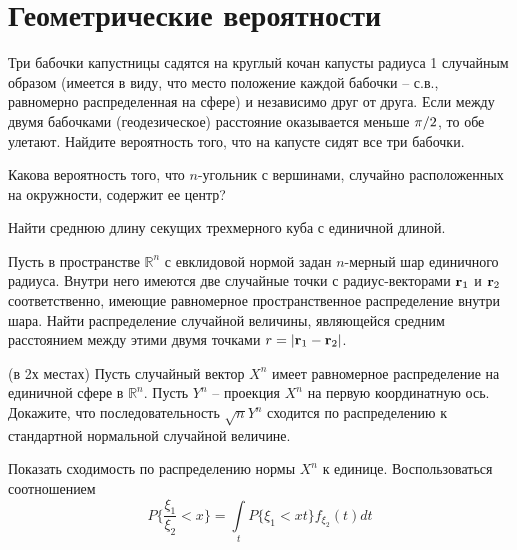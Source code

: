\section{Геометрические вероятности}

\begin{problem}

Три бабочки капустницы садятся на круглый кочан капусты радиуса 1 случайным образом (имеется в виду, что место положение каждой бабочки -- с.в., равномерно распределенная на сфере) и независимо друг от друга. Если между двумя бабочками (геодезическое) расстояние оказывается меньше ${\pi \mathord{\left/ {\vphantom {\pi  2}} \right. \kern-\nulldelimiterspace} 2} $, то обе улетают. Найдите вероятность того, что на капусте сидят все три бабочки.

\end{problem}

\begin{problem}
Какова вероятность того, что $n$-угольник с вершинами, случайно расположенных на окружности, содержит ее центр?
\end{problem}

\begin{problem}
Найти среднюю длину секущих трехмерного куба с единичной длиной.
\end{problem}

\begin{problem}
Пусть в пространстве $\mathbb R^n$ с евклидовой нормой задан $n$-мерный шар единичного радиуса. Внутри него имеются две случайные точки с радиус-векторами ${\bf{r}}_1$ и ${\bf{r}}_2$ соответственно, имеющие равномерное пространственное распределение внутри шара. Найти распределение случайной величины, являющейся средним расстоянием между этими двумя точками $r = \left|{\bf r}_1 - {\bf r}_2\right|$.
\end{problem}

\begin{problem} (в 2х местах)
Пусть случайный вектор $X^{n} $ имеет равномерное распределение на единичной сфере в ${\mathbb R}^{n} $. Пусть $Y^{n} $ -- проекция $X^{n} $ на первую координатную ось. Докажите, что последовательность $\sqrt{n} Y^{n} $ сходится по распределению к стандартной нормальной случайной величине.

\begin{ordre} 
Показать сходимость по распределению нормы $X^{n} $ к единице. Воспользоваться соотношением
\[
P\{ \frac{\xi_1}{\xi_2} < x \} = \underset{t}{\int} P\{\xi_1 < xt \} f_{\xi_2}(t) dt
\] 
\end{ordre}
\end{problem}



